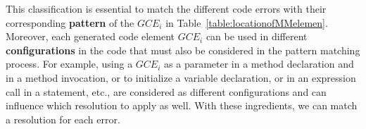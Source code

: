 This classification is essential to match the different code errors with their corresponding \textbf{pattern} of the $GCE_i$ in Table~\ref{table:locationofMMelemen}. 
%
Moreover, each generated code element $GCE_i$ can be used in different \textbf{configurations} in the code that must also be considered in the pattern matching process. For example, using a $GCE_i$ as a parameter in a method declaration and in a method invocation, or to initialize a variable declaration, or in an expression call in a statement, etc., are considered as different configurations and can influence which resolution to apply as well. With these ingredients, we can match a resolution for each error. 

